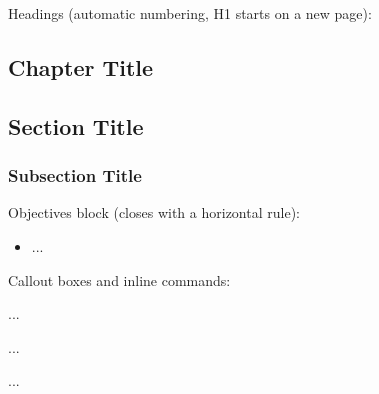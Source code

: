 \documentclass[english]{guide}
\begin{document}
Headings (automatic numbering, H1 starts on a new page):

\begin{codigo}
\section{Chapter Title}          %
\subsection{Section Title}        %
\subsubsection{Subsection Title}  %
\end{codigo}

Objectives block (closes with a horizontal rule):

\begin{codigo}
\begin{objetivos}
  \prerequisitos
  \begin{itemize}
    \item ...
  \end{itemize}
\end{objetivos}
\end{codigo}

Callout boxes and inline commands:

\begin{codigo}
\begin{aviso} ... \end{aviso}     %
\begin{dica}  ... \end{dica}      %
\begin{infobox} ... \end{infobox} %
\end{codigo}

\begin{codigo}
\end{codigo}

\end{document}
